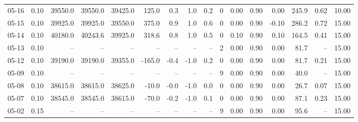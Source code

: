 \begin{threeparttable}
{\begin{tabular}{lrrrrrrrrrrrrrrr}
  05-16 &     0.10 & 39550.0 & 39550.0 & 39425.0 &      125.0 &            0.3 &                      1.0 &                 0.2 &              0 &       0.00 &      0.90 &           0.00 &            245.9 &            0.62 &                  10.00 \\
  05-15 &     0.10 & 39925.0 & 39925.0 & 39550.0 &      375.0 &            0.9 &                      1.0 &                 0.6 &              0 &       0.00 &      0.90 &          -0.10 &            286.2 &            0.72 &                  15.00 \\
  05-14 &     0.10 & 40180.0 & 40243.6 & 39925.0 &      318.6 &            0.8 &                      1.0 &                 0.5 &              0 &       0.10 &      0.90 &           0.10 &            164.5 &            0.41 &                  15.00 \\
  05-13 &     0.10 &      -- &      -- &      -- &         -- &             -- &                       -- &                  -- &              2 &       0.00 &      0.90 &           0.00 &             81.7 &              -- &                  15.00 \\
  05-12 &     0.10 & 39190.0 & 39190.0 & 39355.0 &     -165.0 &           -0.4 &                     -1.0 &                 0.2 &              0 &       0.00 &      0.90 &           0.00 &             81.7 &            0.21 &                  15.00 \\
  05-09 &     0.10 &      -- &      -- &      -- &         -- &             -- &                       -- &                  -- &              9 &       0.00 &      0.90 &           0.00 &             40.0 &              -- &                  15.00 \\
  05-08 &     0.10 & 38615.0 & 38615.0 & 38625.0 &      -10.0 &           -0.0 &                     -1.0 &                 0.0 &              0 &       0.00 &      0.90 &           0.00 &             26.7 &            0.07 &                  15.00 \\
  05-07 &     0.10 & 38545.0 & 38545.0 & 38615.0 &      -70.0 &           -0.2 &                     -1.0 &                 0.1 &              0 &       0.00 &      0.90 &           0.00 &             87.1 &            0.23 &                  15.00 \\
  05-02 &     0.15 &      -- &      -- &      -- &         -- &             -- &                       -- &                  -- &              9 &       0.00 &      0.90 &           0.00 &             95.6 &              -- &                  15.00 \\

\end{tabular}}
\end{threeparttable}
